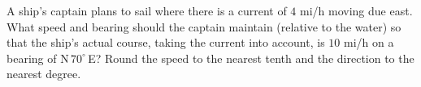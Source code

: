 A ship's captain plans to sail where there is a current of $4$ mi/h moving due east. What speed and bearing should the captain maintain (relative to the water) so that the ship's actual course, taking the current into account, is $10$ mi/h on a bearing of N$\,70^\circ\,$E? Round the speed to the nearest tenth and the direction to the nearest degree.
